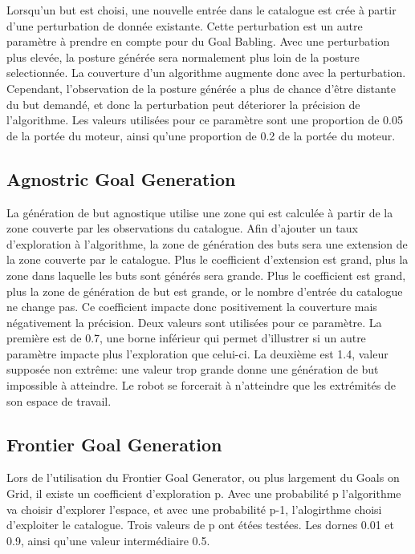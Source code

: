 \documentclass[11pt,french]{report}
\begin{document}
Lorsqu'un but est choisi, une nouvelle entrée dans le catalogue est crée à partir d'une perturbation de donnée existante.
Cette perturbation est un autre paramètre à prendre en compte pour du Goal Babling.
Avec une perturbation plus elevée, la posture générée sera normalement plus loin de la posture selectionnée.
La couverture d'un algorithme augmente donc avec la perturbation.
Cependant, l'observation de la posture générée a plus de chance d'être distante du but demandé, et donc la perturbation peut déteriorer la précision de l'algorithme.
Les valeurs utilisées pour ce paramètre sont une proportion de 0.05 de la portée du moteur, ainsi qu'une proportion de 0.2 de la portée du moteur.

\subsection{Agnostric Goal Generation}

La génération de but agnostique utilise une zone qui est calculée à partir de la zone couverte par les observations du catalogue.
Afin d'ajouter un taux d'exploration à l'algorithme, la zone de génération des buts sera une extension de la zone couverte par le catalogue.
Plus le coefficient d'extension est grand, plus la zone dans laquelle les buts sont générés sera grande.
Plus le coefficient est grand, plus la zone de génération de but est grande, or le nombre d'entrée du catalogue ne change pas.
Ce coefficient impacte donc positivement la couverture mais négativement la précision.
Deux valeurs sont utilisées pour ce paramètre.
La première est de 0.7, une borne inférieur qui permet d'illustrer si un autre paramètre impacte plus l'exploration que celui-ci.
La deuxième est 1.4, valeur supposée non extrême: une valeur trop grande donne une génération de but impossible à atteindre.
Le robot se forcerait à n'atteindre que les extrémités de son espace de travail.

\subsection{Frontier Goal Generation}

Lors de l'utilisation du Frontier Goal Generator, ou plus largement du Goals on Grid, il existe un coefficient d'exploration p.
Avec une probabilité p l'algorithme va choisir d'explorer l'espace, et avec une probabilité p-1, l'alogirthme choisi d'exploiter le catalogue.
Trois valeurs de p ont étées testées.
Les dornes 0.01 et 0.9, ainsi qu'une valeur intermédiaire 0.5.
\end{document}
